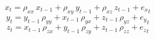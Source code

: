 \begin{dmath}
{x}_{t}={\rho_{xx}}\, {x}_{t-1}+{\rho_{xy}}\, {y}_{t-1}+{\rho_{xz}}\, {z}_{t-1}+{e_x}_{t}
\end{dmath}
\begin{dmath}
{y}_{t}={y}_{t-1}\, {\rho_{yy}}+{x}_{t-1}\, {\rho_{yx}}+{z}_{t-1}\, {\rho_{yz}}+{e_y}_{t}
\end{dmath}
\begin{dmath}
{z}_{t}={x}_{t-1}\, {\rho_{zx}}+{y}_{t-1}\, {\rho_{zy}}+{z}_{t-1}\, {\rho_{zz}}+{e_z}_{t}
\end{dmath}
